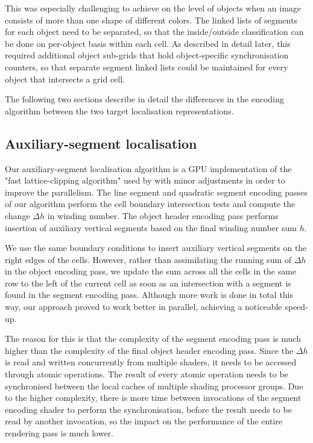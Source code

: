 \documentclass[11pt,a4paper,twoside]{article}
\begin{document}
This was especially challenging to achieve on the level of objects when an image consists of more than one shape of different colors. The linked lists of segments for each object need to be separated, so that the inside/outside classification can be done on per-object basis within each cell. As described in detail later, this required additional object sub-grids that hold object-specific synchronisation counters, so that separate segment linked lists could be maintained for every object that intersects a grid cell.

The following two sections describe in detail the differences in the encoding algorithm between the two target localisation representations.

\subsection{Auxiliary-segment localisation}

Our auxiliary-segment localisation algorithm is a GPU implementation of the "fast lattice-clipping algorithm" used by \cite{NehabHoppe08} with minor adjustments in order to improve the parallelism. The line segment and quadratic segment encoding passes of our algorithm perform the cell boundary intersection tests and compute the change  $\Delta{h}$ in winding number. The object header encoding pass performs insertion of auxiliary vertical segments based on the final winding number sum $h$.

We use the same boundary conditions to insert auxiliary vertical segments on the right edges of the cells. However, rather than assimilating the running sum of $\Delta{h}$ in the object encoding pass, we update the sum across all the cells in the same row to the left of the current cell as soon as an intersection with a segment is found in the segment encoding pass. Although more work is done in total this way, our approach proved to work better in parallel, achieving a noticeable speed-up.

The reason for this is that the complexity of the segment encoding pass is much higher than the complexity of the final object header encoding pass. Since the $\Delta{h}$ is read and written concurrently from multiple shaders, it needs to be accessed through atomic operations. The result of every atomic operation needs to be synchronised between the local caches of multiple shading processor groups. Due to the higher complexity, there is more time between invocations of the segment encoding shader to perform the synchronisation, before the result needs to be read by another invocation, so the impact on the performance of the entire rendering pass is much lower.
\end{document}
